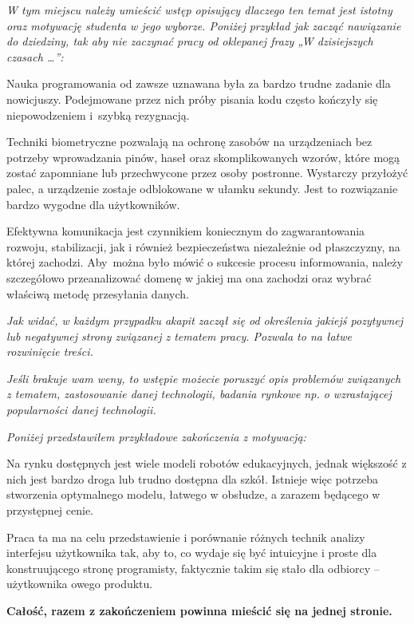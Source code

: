 \textit{W tym miejscu należy umieścić wstęp opisujący dlaczego ten temat jest istotny oraz motywację studenta w jego wyborze. Poniżej przykład jak zacząć nawiązanie do dziedziny, tak aby nie zaczynać pracy od oklepanej frazy „W dzisiejszych czasach …”:}

Nauka programowania od zawsze uznawana była za bardzo trudne zadanie dla nowicjuszy. Podejmowane przez nich próby pisania kodu często kończyły się niepowodzeniem i szybką rezygnacją.

Techniki biometryczne pozwalają na ochronę zasobów na urządzeniach bez potrzeby wprowadzania pinów, haseł oraz skomplikowanych wzorów, które mogą zostać zapomniane lub przechwycone przez osoby postronne. Wystarczy przyłożyć palec, a urządzenie zostaje odblokowane w ułamku sekundy. Jest to rozwiązanie bardzo wygodne dla użytkowników.

Efektywna komunikacja jest czynnikiem koniecznym do zagwarantowania rozwoju, stabilizacji, jak i również bezpieczeństwa niezależnie od płaszczyzny, na której zachodzi. Aby można było mówić o sukcesie procesu informowania, należy szczegółowo przeanalizować domenę w jakiej ma ona zachodzi oraz wybrać właściwą metodę przesyłania danych.

\textit{Jak widać, w każdym przypadku akapit zaczął się od określenia jakiejś pozytywnej lub negatywnej strony związanej z tematem pracy. Pozwala to na łatwe rozwinięcie treści.}

\textit{Jeśli brakuje wam weny, to wstępie możecie poruszyć opis problemów związanych z tematem, zastosowanie danej technologii, badania rynkowe np. o wzrastającej popularności danej technologii.}

\textit{Poniżej przedstawiłem przykładowe zakończenia z motywacją:}

Na rynku dostępnych jest wiele modeli robotów edukacyjnych, jednak większość 
z nich jest bardzo droga lub trudno dostępna dla szkół. Istnieje więc potrzeba stworzenia optymalnego modelu, łatwego w obsłudze, a zarazem będącego w przystępnej cenie. 

Praca ta ma na celu przedstawienie i porównanie różnych technik analizy interfejsu użytkownika tak, aby to, co wydaje się być intuicyjne i proste dla konstruującego stronę programisty, faktycznie takim się stało dla odbiorcy – użytkownika owego produktu.

\textbf{Całość, razem z zakończeniem powinna mieścić się na jednej stronie.}